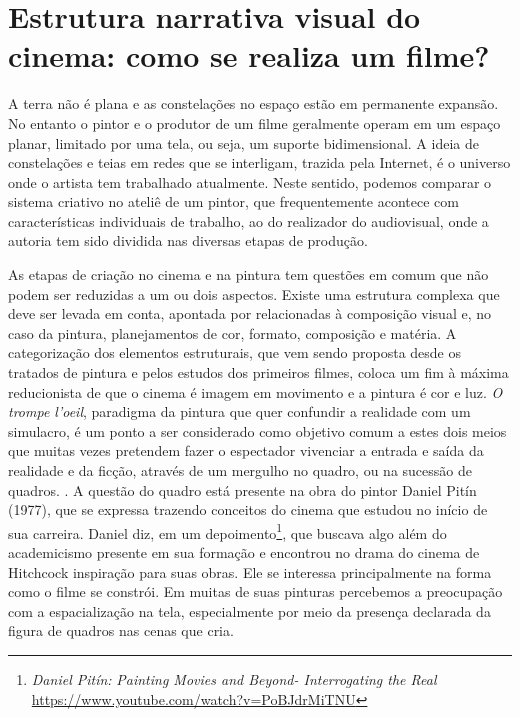 \section{Estrutura narrativa visual do cinema: como se realiza um filme?}%
\label{sec:estrutura-narrativa-visual-do-cinema-como-se-realiza-um-filme}

A terra não é plana e as constelações no espaço estão em permanente
expansão. No entanto o pintor e o produtor de um filme geralmente
operam em um espaço planar, limitado por uma tela, ou seja, um suporte
bidimensional. A ideia de constelações e teias em redes que se
interligam, trazida pela Internet, é o universo onde o artista tem
trabalhado atualmente. Neste sentido, podemos comparar o sistema
criativo no ateliê de um pintor, que frequentemente acontece com
características individuais de trabalho, ao do realizador do
audiovisual, onde a autoria tem sido dividida nas diversas etapas de
produção.

As etapas de criação no cinema e na pintura tem questões em comum que
não podem ser reduzidas a um ou dois aspectos. Existe uma estrutura
complexa que deve ser levada em conta, apontada por \textcite{block2021visual}
relacionadas à composição visual e, no caso da
pintura, planejamentos de cor, formato, composição e matéria. A
categorização dos elementos estruturais, que vem sendo proposta desde
os tratados de pintura e pelos estudos dos primeiros filmes, coloca um
fim à máxima reducionista de que o cinema é imagem em movimento e a
pintura é cor e luz. \emph{O trompe l'oeil}, paradigma da pintura que
quer confundir a realidade com um simulacro, é um ponto a ser
considerado como objetivo comum a estes dois meios que muitas vezes
pretendem fazer o espectador vivenciar a entrada e saída da realidade e
da ficção, através de um mergulho no quadro, ou na sucessão de quadros.
\parencite{sabino2000pintura}. A questão do quadro está presente na obra do pintor
Daniel Pitín (1977), que se expressa trazendo conceitos do cinema que
estudou no início de sua carreira. Daniel diz, em um
depoimento\footnote{\emph{Daniel Pitín:} \emph{Painting Movies and
		Beyond- Interrogating the Real}
	\url{https://www.youtube.com/watch?v=PoBJdrMiTNU}}, que
buscava algo além do academicismo presente em sua formação e encontrou
no drama do cinema de Hitchcock inspiração para suas obras. Ele se
interessa principalmente na forma como o filme se constrói. Em muitas
de suas pinturas percebemos a preocupação com a espacialização na tela,
especialmente por meio da presença declarada da figura de quadros nas
cenas que cria.

